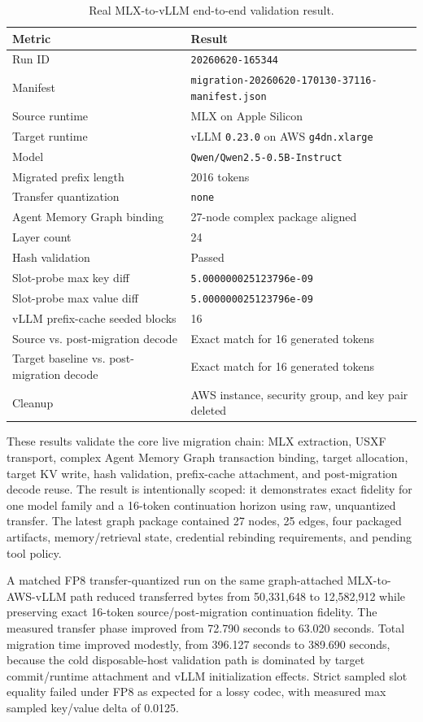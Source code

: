 \documentclass[11pt]{article}
\begin{document}
\begin{table}[h]
\centering
\begin{tabular}{ll}
\toprule
Metric & Result \\
\midrule
Run ID & \texttt{20260620-165344} \\
Manifest & \texttt{migration-20260620-170130-37116-manifest.json} \\
Source runtime & MLX on Apple Silicon \\
Target runtime & vLLM \texttt{0.23.0} on AWS \texttt{g4dn.xlarge} \\
Model & \texttt{Qwen/Qwen2.5-0.5B-Instruct} \\
Migrated prefix length & 2016 tokens \\
Transfer quantization & \texttt{none} \\
Agent Memory Graph binding & 27-node complex package aligned \\
Layer count & 24 \\
Hash validation & Passed \\
Slot-probe max key diff & \texttt{5.000000025123796e-09} \\
Slot-probe max value diff & \texttt{5.000000025123796e-09} \\
vLLM prefix-cache seeded blocks & 16 \\
Source vs. post-migration decode & Exact match for 16 generated tokens \\
Target baseline vs. post-migration decode & Exact match for 16 generated tokens \\
Cleanup & AWS instance, security group, and key pair deleted \\
\bottomrule
\end{tabular}
\caption{Real MLX-to-vLLM end-to-end validation result.}
\label{tab:e2e}
\end{table}

These results validate the core live migration chain: MLX extraction, USXF transport, complex Agent Memory Graph transaction binding, target allocation, target KV write, hash validation, prefix-cache attachment, and post-migration decode reuse. The result is intentionally scoped: it demonstrates exact fidelity for one model family and a 16-token continuation horizon using raw, unquantized transfer. The latest graph package contained 27 nodes, 25 edges, four packaged artifacts, memory/retrieval state, credential rebinding requirements, and pending tool policy.

A matched FP8 transfer-quantized run on the same graph-attached MLX-to-AWS-vLLM path reduced transferred bytes from 50,331,648 to 12,582,912 while preserving exact 16-token source/post-migration continuation fidelity. The measured transfer phase improved from 72.790 seconds to 63.020 seconds. Total migration time improved modestly, from 396.127 seconds to 389.690 seconds, because the cold disposable-host validation path is dominated by target commit/runtime attachment and vLLM initialization effects. Strict sampled slot equality failed under FP8 as expected for a lossy codec, with measured max sampled key/value delta of 0.0125.
\end{document}
